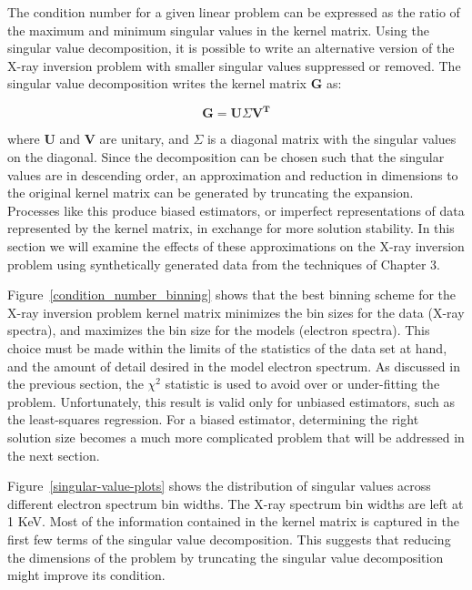 The condition number for a given linear problem can be expressed as the ratio of the maximum and minimum singular values in the kernel matrix. Using the singular value decomposition, it is possible to write an alternative version of the X-ray inversion problem with smaller singular values suppressed or removed. The singular value decomposition writes the kernel matrix $\mathbf{G}$ as:

$$\mathbf{G} = \mathbf{U}\Sigma\mathbf{V^T}$$

where $\mathbf{U}$ and $\mathbf{V}$ are unitary, and $\Sigma$ is a diagonal matrix with the singular values on the diagonal. Since the decomposition can be chosen such that the singular values are in descending order, an approximation and reduction in dimensions to the original kernel matrix can be generated by truncating the expansion. Processes like this produce biased estimators, or imperfect representations of data represented by the kernel matrix, in exchange for more solution stability. In this section we will examine the effects of these approximations on the X-ray inversion problem using synthetically generated data from the techniques of Chapter 3. 

Figure~\ref{condition_number_binning} shows that the best binning scheme for the X-ray inversion problem kernel matrix minimizes the bin sizes for the data (X-ray spectra), and maximizes the bin size for the models (electron spectra). This choice must be made within the limits of the statistics of the data set at hand, and the amount of detail desired in the model electron spectrum. As discussed in the previous section, the $\chi^2$ statistic is used to avoid over or under-fitting the problem. Unfortunately, this result is valid only for unbiased estimators, such as the least-squares regression. For a biased estimator, determining the right solution size becomes a much more complicated problem that will be addressed in the next section.

Figure~\ref{singular-value-plots} shows the distribution of singular values across different electron spectrum bin widths. The X-ray spectrum bin widths are left at 1 KeV. Most of the information contained in the kernel matrix is captured in the first few terms of the singular value decomposition. This suggests that reducing the dimensions of the problem by truncating the singular value decomposition might improve its condition.

